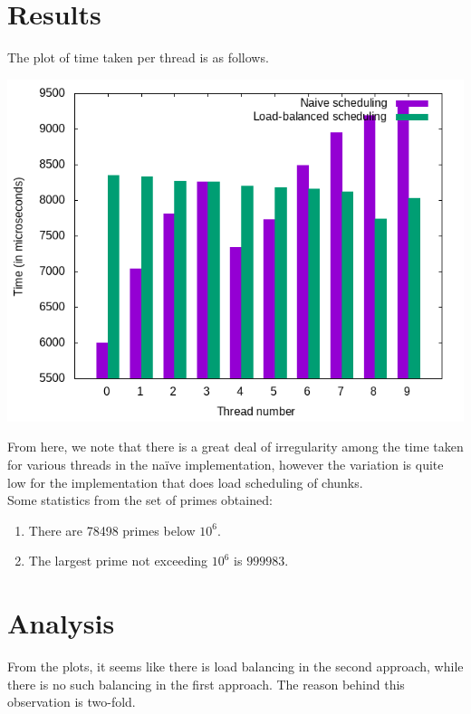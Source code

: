 \documentclass[a4paper]{article}
\newcommand{\nl}{\vspace{0.2cm}\\}
\begin{document}
\section{Results}

The plot of time taken per thread is as follows.

\begin{center}
    \includegraphics[scale=0.7]{./output/local_outputs/timing_plot.png}
\end{center}

From here, we note that there is a great deal of irregularity among the time taken for various threads in the na\"ive implementation, however the variation is quite low for the implementation
that does load scheduling of chunks.\nl

Some statistics from the set of primes obtained:

\begin{enumerate}
    \item There are 78498 primes below $10^6$.
    \item The largest prime not exceeding $10^6$ is $999983$.
\end{enumerate}

\section{Analysis}

From the plots, it seems like there is load balancing in the second approach, while there is no such balancing in the first approach. The reason behind this observation is two-fold.
\end{document}
